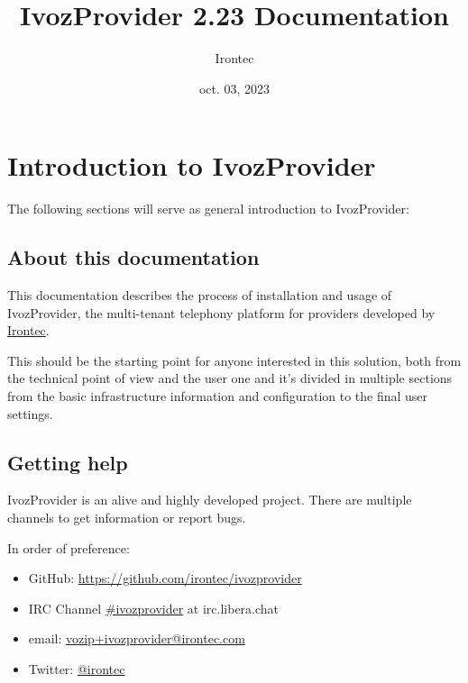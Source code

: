 \documentclass[letterpaper,10pt,spanish]{sphinxmanual}
\title{IvozProvider 2.23 Documentation}
\date{oct. 03, 2023}
\author{Irontec}
\begin{document}
\maketitle
\tableofcontents
{}\label{index::doc}



\chapter{Introduction to IvozProvider}
\label{basic_concepts/intro/index::doc}\label{basic_concepts/intro/index:introduction-to-ivozprovider}\label{basic_concepts/intro/index:ivozprovider-official-documentation}
The following sections will serve as general introduction to IvozProvider:


\section{About this documentation}
\label{basic_concepts/intro/about::doc}\label{basic_concepts/intro/about:about-this-documentation}
This documentation describes the process of installation and usage of
IvozProvider, the multi-tenant telephony platform for providers developed
by \href{http://irontec.com}{Irontec}.

This should be the starting point for anyone interested in this solution,
both from the technical point of view and the user one and it's divided
in multiple sections from the basic infrastructure information and configuration
to the final user settings.


\section{Getting help}
\label{basic_concepts/intro/getting_help:getting-help}\label{basic_concepts/intro/getting_help::doc}\label{basic_concepts/intro/getting_help:id1}
IvozProvider is an alive and highly developed project. There are
multiple channels to get information or report bugs.

In order of preference:
\begin{itemize}
\item {} 
GitHub: \url{https://github.com/irontec/ivozprovider}

\item {} 
IRC Channel \href{https://kiwiirc.com/nextclient/irc.libera.chat/\#ivozprovider}{\#ivozprovider} at irc.libera.chat

\item {} 
email: \href{mailto:vozip+ivozprovider@irontec.com}{vozip+ivozprovider@irontec.com}

\item {} 
Twitter: \href{https://twitter.com/irontec}{@irontec}

\end{itemize}
\end{document}

